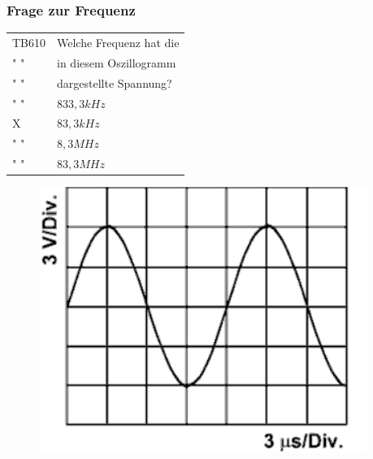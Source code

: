 \begin{frame}
  \frametitle{Frage zur Frequenz}
  \begin{minipage}{0.6\textwidth}
    \begin{tabular}{l||l}\hline
        TB610& Welche Frequenz hat die\\
        " " &  in diesem Oszillogramm\\
        " " & dargestellte Spannung?\\ \hline\hline
         " " & $833,3 kHz$ \\ \hline
         X & $83,3kHz$\\ \hline
         " "& $8,3MHz$ \\\hline
         " " & $83,3MHz$ \\\hline
      \end{tabular}
  \end{minipage}
  \begin{minipage}{0.3\textwidth}
    \begin{figure}
       \includegraphics[width=.9\textwidth]{e02/TB610}
     \end{figure}
    \end{minipage}
\end{frame}

